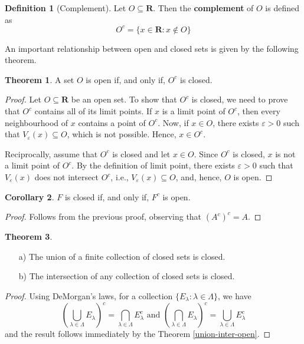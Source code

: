 \documentclass[tikz,12pt,a4paper]{article}
\theoremstyle{definition}
\newtheorem{theorem}{Theorem}[section]
\newtheorem{corollary}[theorem]{Corollary}
\newtheorem{definition}{Definition}[section]
\begin{document}
\begin{definition}[Complement]
	Let $O \subseteq \textbf{R}$. Then the \textbf{complement} of $O$ is defined as
	\[
		O^c = \{ x \in \textbf{R} : x \notin O \}
	\]
\end{definition}

An important relationship between open and closed sets is given by the following theorem.

\begin{theorem}
	A set $O$ is open if, and only if, $O^c$ is closed.
\end{theorem}

\begin{proof}
	Let $O \subseteq \textbf{R}$ be an open set. To show that $O^c$ is closed, we need to prove that $O^c$ contains all of its limit points. If $x$ is a limit point of $O^c$, then every neighbourhood of $x$ contains a point of $O^c$. Now, if $x \in O$, there exists $\varepsilon > 0$ such that $V_{\varepsilon}(x) \subseteq O$, which is not possible. Hence, $x \in O^c$.
	
	Reciprocally, assume that $O^c$ is closed and let $x \in O$. Since $O^c$ is closed, $x$ is not a limit point of $O^c$. By the definition of limit point, there exists $\varepsilon > 0$ such that $V_{\varepsilon}(x)$ does not intersect $O^c$, i.e., $V_{\varepsilon}(x) \subseteq O$, and, hence, $O$ is open.
\end{proof}

\begin{corollary}
	$F$ is closed if, and only if, $F^c$ is open.
\end{corollary}

\begin{proof}
	Follows from the previous proof, observing that $(A^c)^c = A$.
\end{proof}

\begin{theorem}\label{union-inter-closed}
	\begin{itemize} \hfill
		\item[a)] The union of a finite collection of closed sets is closed.
		\item[b)] The intersection of any collection of closed sets is closed.
	\end{itemize}
\end{theorem}

\begin{proof}
	Using DeMorgan's laws, for a collection $\{ E_{\lambda} : \lambda \in \Lambda\}$, we have
	\[
		\left( \bigcup_{\lambda \in \Lambda} E_\lambda \right)^c = \bigcap_{\lambda \in \Lambda} E_\lambda^c \text{ and } \left( \bigcap_{\lambda \in \Lambda} E_\lambda \right)^c = \bigcup_{\lambda \in \Lambda} E_\lambda^c
	\]
	and the result follows immediately by the Theorem \ref{union-inter-open}.
\end{proof}
\end{document}
